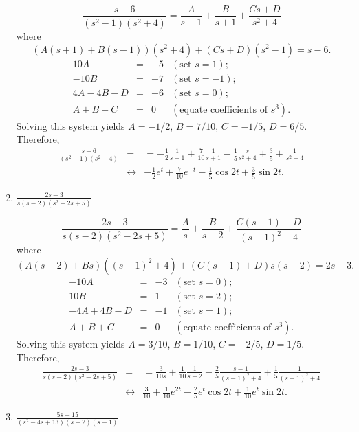 \documentclass{ximera}
\begin{document}
\begin{problem}
\begin{enumerate}
\begin{solution}
$$
\frac{s-6}{(s^2-1)(s^2+4)}
=\frac{A}{s-1}+\frac{B}{s+1}+\frac{Cs+D}{s^2+4}
$$
where
$$
(A(s+1)+B(s-1))(s^2+4)+(Cs+D)(s^2-1)=s-6.
$$
$$
\begin{array}{rcrl}
10A&=&-5&(\mbox{set }s=1);\\
-10B&=&-7& (\mbox{set }s=-1);\\
4A-4B-D&=&-6& (\mbox{set }s=0);\\
A+B+C&=&0&(\mbox{equate coefficients of }s^3).
\end{array}
$$
Solving this system yields $A=-1/2$, $B=7/10$,
$C=-1/5$, $D=6/5$. Therefore,
\begin{eqnarray*}
\frac{s-6}{(s^2-1)(s^2+4)}
&=&
=-\frac{1}{2}\frac{1}{s-1}+\frac{7}{10}\frac{1}{s+1}-\frac{1}{5}\frac{s}{s^2+4}
+\frac{3}{5}+\frac{1}{s^2+4}
\\&\leftrightarrow&
-\frac{1}{2}e^t+\frac{7}{10}e^{-t}-\frac{1}{5}\cos 2t+\frac{3}{5}\sin 2t.
\end{eqnarray*}
\end{solution}

\item $\frac{2s-3}{s(s-2)(s^2-2s+5)}$

\begin{solution}
$$
\frac{2s-3}{s(s-2)(s^2-2s+5)}
=\frac{A}{s}+\frac{B}{s-2}+\frac{C(s-1)+D}{(s-1)^2+4}
$$
where
$$
(A(s-2)+Bs)((s-1)^2+4)+(C(s-1)+D)s(s-2)=2s-3.
$$
$$
\begin{array}{rcrl}
-10A&=&-3&(\mbox{set }s=0);\\
10B&=&1& (\mbox{set }s=2);\\
-4A+4B-D&=&-1& (\mbox{set }s=1);\\
A+B+C&=&0&(\mbox{equate coefficients of }s^3).
\end{array}
$$
Solving this system yields $A=3/10$, $B=1/10$,
$C=-2/5$, $D=1/5$. Therefore,
\begin{eqnarray*}
\frac{2s-3}{s(s-2)(s^2-2s+5)}
&=&
=\frac{3}{10s}+\frac{1}{10}\frac{1}{s-2}-\frac{2}{5}\frac{s-1}{(s-1)^2+4}
+\frac{1}{5}\frac{1}{(s-1)^2+4}
\\&\leftrightarrow&
\frac{3}{10}+\frac{1}{10}e^{2t}-\frac{2}{5}e^t\cos 2t
+\frac{1}{10}e^t\sin2t.
\end{eqnarray*}
\end{solution}

\item $\frac{5s-15}{(s^2-4s+13)(s-2)(s-1)}$


\end{enumerate}
\end{problem}
\end{document}
